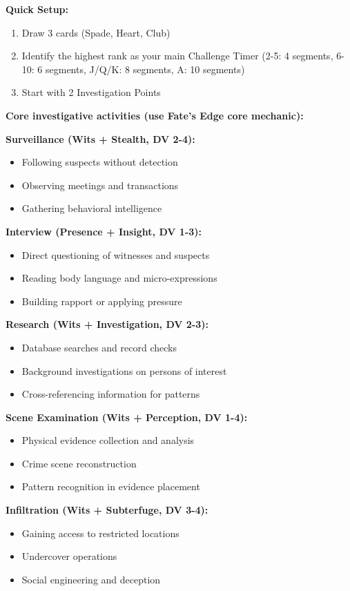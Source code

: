 \documentclass[11pt]{article}
\begin{document}
\textbf{Quick Setup:}
\begin{enumerate}
    \item Draw 3 cards (Spade, Heart, Club)
    \item Identify the highest rank as your main Challenge Timer (2-5: 4 segments, 6-10: 6 segments, J/Q/K: 8 segments, A: 10 segments)
    \item Start with 2 Investigation Points
\end{enumerate}

\textbf{Core investigative activities (use Fate's Edge core mechanic):}

\textbf{Surveillance (Wits + Stealth, DV 2-4):}
\begin{itemize}
    \item Following suspects without detection
    \item Observing meetings and transactions
    \item Gathering behavioral intelligence
\end{itemize}

\textbf{Interview (Presence + Insight, DV 1-3):}
\begin{itemize}
    \item Direct questioning of witnesses and suspects
    \item Reading body language and micro-expressions
    \item Building rapport or applying pressure
\end{itemize}

\textbf{Research (Wits + Investigation, DV 2-3):}
\begin{itemize}
    \item Database searches and record checks
    \item Background investigations on persons of interest
    \item Cross-referencing information for patterns
\end{itemize}

\textbf{Scene Examination (Wits + Perception, DV 1-4):}
\begin{itemize}
    \item Physical evidence collection and analysis
    \item Crime scene reconstruction
    \item Pattern recognition in evidence placement
\end{itemize}

\textbf{Infiltration (Wits + Subterfuge, DV 3-4):}
\begin{itemize}
    \item Gaining access to restricted locations
    \item Undercover operations
    \item Social engineering and deception
\end{itemize}
\end{document}
